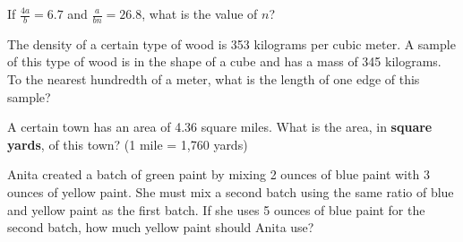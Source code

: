
\vspace{2em}
\newpage
\noindent\markforreview
\vspace{1em}

If $\frac{4a}{b} = 6.7$ and $\frac{a}{bn} = 26.8$, what is the value of $n$?

\vspace{0.75em}


\vspace{2em}

\noindent\markforreview
\vspace{1em}

The density of a certain type of wood is 353 kilograms per cubic meter.  
A sample of this type of wood is in the shape of a cube and has a mass of 345 kilograms.  
To the nearest hundredth of a meter, what is the length of one edge of this sample?

\vspace{0.75em}


\vspace{2em}

\noindent\markforreview
\vspace{1em}

A certain town has an area of 4.36 square miles.  
What is the area, in \textbf{square yards}, of this town?  
(1 mile = 1,760 yards)

\vspace{0.75em}


\newpage

\noindent\markforreview
\vspace{1em}

Anita created a batch of green paint by mixing 2 ounces of blue paint with 3 ounces of yellow paint.  
She must mix a second batch using the same ratio of blue and yellow paint as the first batch.  
If she uses 5 ounces of blue paint for the second batch, how much yellow paint should Anita use?

\vspace{0.75em}


